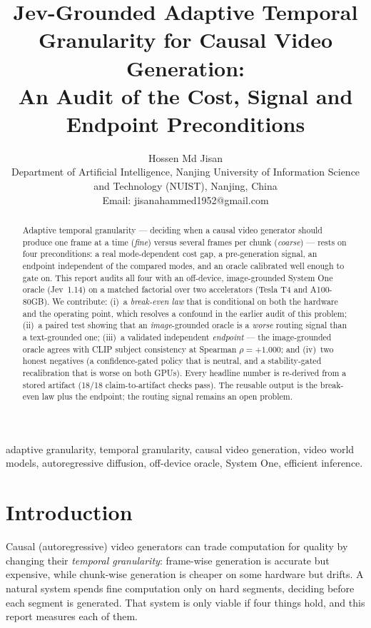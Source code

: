 \documentclass[journal]{IEEEtran}
\title{Jev-Grounded Adaptive Temporal Granularity for Causal Video Generation:\\
An Audit of the Cost, Signal and Endpoint Preconditions}
\author{Hossen Md Jisan\\
Department of Artificial Intelligence, Nanjing University of Information Science and Technology (NUIST), Nanjing, China\\
Email: jisanahammed1952@gmail.com}
\begin{document}
\maketitle

\begin{abstract}
Adaptive temporal granularity --- deciding when a causal video generator should produce one frame at a
time (\emph{fine}) versus several frames per chunk (\emph{coarse}) --- rests on four preconditions: a real
mode-dependent cost gap, a pre-generation signal, an endpoint independent of the compared modes, and an
oracle calibrated well enough to gate on. This report audits all four with an off-device,
image-grounded System One oracle (Jev~1.14) on a matched factorial over two accelerators (Tesla T4 and
A100-80GB). We contribute: (i)~a \emph{break-even law} that is conditional on both the hardware and the
operating point, which resolves a confound in the earlier audit of this problem; (ii)~a paired test
showing that an \emph{image}-grounded oracle is a \emph{worse} routing signal than a text-grounded one;
(iii)~a validated independent \emph{endpoint} --- the image-grounded oracle agrees with CLIP subject
consistency at Spearman $\rho{=}{+}1.000$; and (iv)~two honest negatives (a confidence-gated policy that
is neutral, and a stability-gated recalibration that is worse on both GPUs). Every headline number is
re-derived from a stored artifact (18/18 claim-to-artifact checks pass). The reusable output is the
break-even law plus the endpoint; the routing signal remains an open problem.
\end{abstract}

\begin{IEEEkeywords}
adaptive granularity, temporal granularity, causal video generation, video world models,
autoregressive diffusion, off-device oracle, System One, efficient inference.
\end{IEEEkeywords}

\section{Introduction}
Causal (autoregressive) video generators can trade computation for quality by changing their
\emph{temporal granularity}: frame-wise generation is accurate but expensive, while chunk-wise generation
is cheaper on some hardware but drifts. A natural system spends fine computation only on hard segments,
deciding before each segment is generated. That system is only viable if four things hold, and this
report measures each of them.
\end{document}
